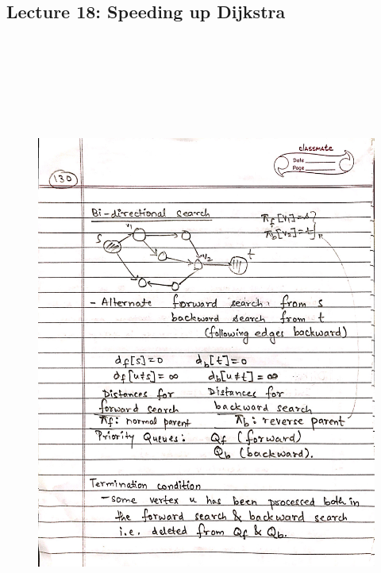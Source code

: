 \newpage
{\color{black} \subsection*{Lecture 18: Speeding up Dijkstra}}
\begin{figure}[H]
    \centering
    \includegraphics[width=16cm, height=21cm]{"./MIT-6.006/MIT-6006-130"}
\end{figure}

